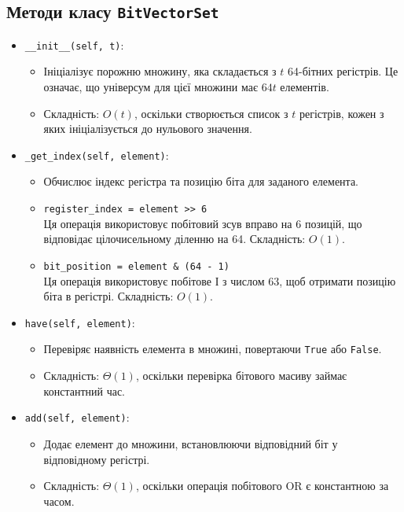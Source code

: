 \documentclass[a4paper,12pt]{article}
\begin{document}
\subsection{Методи класу \texttt{BitVectorSet}}

\begin{itemize}
    \item \texttt{\_\_init\_\_(self, t)}:
    \begin{itemize}
        \item Ініціалізує порожню множину, яка складається з $t$ 64-бітних регістрів. Це означає, що універсум для цієї множини має $64t$ елементів.
        \item Складність: $O(t)$, оскільки створюється список з $t$ регістрів, кожен з яких ініціалізується до нульового значення.
    \end{itemize}

    \item \texttt{\_get\_index(self, element)}:
    \begin{itemize}
        \item Обчислює індекс регістра та позицію біта для заданого елемента.
        \item \texttt{register\_index = element >> 6} \\
        Ця операція використовує побітовий зсув вправо на 6 позицій, що відповідає цілочисельному діленню на 64. Складність: $O(1)$.
        \item \texttt{bit\_position = element \& (64 - 1)} \\
        Ця операція використовує побітове І з числом 63, щоб отримати позицію біта в регістрі. Складність: $O(1)$.
    \end{itemize}

    \item \texttt{have(self, element)}:
    \begin{itemize}
        \item Перевіряє наявність елемента в множині, повертаючи \texttt{True} або \texttt{False}.
        \item Складність: $\Theta(1)$, оскільки перевірка бітового масиву займає константний час.
    \end{itemize}

    \item \texttt{add(self, element)}:
    \begin{itemize}
        \item Додає елемент до множини, встановлюючи відповідний біт у відповідному регістрі.
        \item Складність: $\Theta(1)$, оскільки операція побітового OR є константною за часом.
    \end{itemize}


\end{itemize}
\end{document}
